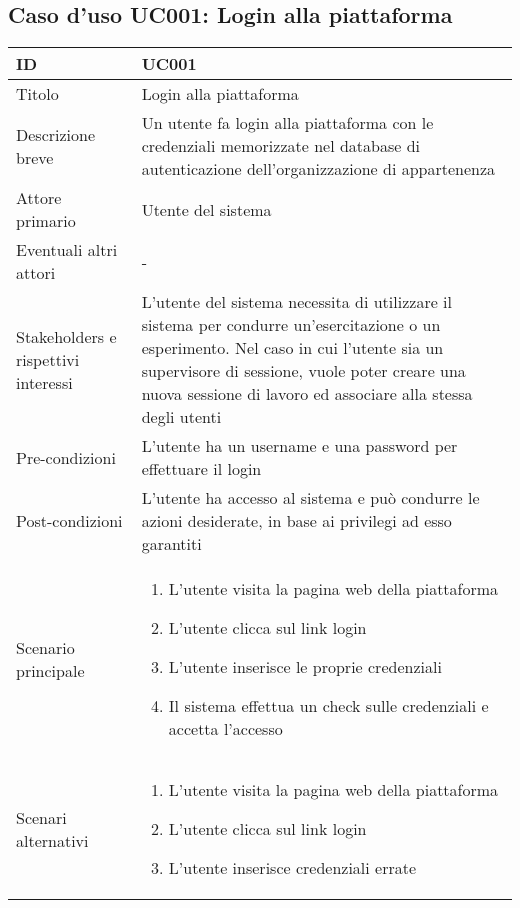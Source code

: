 \documentclass[../../main.tex]{subfiles}
\begin{document}
\subsection{Caso d’uso UC001: Login alla piattaforma}
\begin{tabularx}{150mm}{|l|X|}
    \hline
    ID                                  & \textbf{UC001}\\
    \hline
    Titolo                              & Login alla piattaforma \\
    \hline
    Descrizione breve                   & Un utente fa login alla piattaforma con le credenziali memorizzate nel database di autenticazione dell'organizzazione di appartenenza   \\
    \hline
    Attore primario                     & Utente del sistema \\
    \hline
    Eventuali altri attori              & -   \\
    \hline
    Stakeholders e rispettivi interessi & L'utente del sistema necessita di utilizzare il sistema per condurre un'esercitazione o un esperimento. Nel caso in cui l'utente sia un supervisore di sessione, vuole poter creare una nuova sessione di lavoro ed associare alla stessa degli utenti   \\
    \hline
    Pre-condizioni                      & L'utente ha un username e una password per effettuare il login   \\
    \hline
    Post-condizioni                     & L'utente ha accesso al sistema e può condurre le azioni desiderate, in base ai privilegi ad esso garantiti   \\
    \hline
    Scenario principale                 & \begin {enumerate}
\item {L'utente visita la pagina web della piattaforma}
\item {L'utente clicca sul link login}
\item {L'utente inserisce le proprie credenziali}
\item {Il sistema effettua un check sulle credenziali e accetta l'accesso}
    \end{enumerate}
    \\
    \hline
    Scenari alternativi                 &
    \begin {enumerate}
\item{L'utente visita la pagina web della piattaforma}
\item{L'utente clicca sul link login}
\item{L'utente inserisce credenziali errate}

\end{enumerate}
\end{tabularx}
\end{document}
